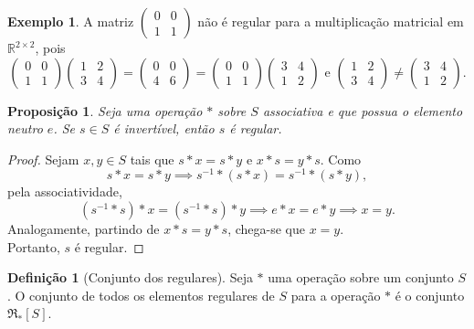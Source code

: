 \documentclass[a4paper,12pt]{article}
\theoremstyle{plain}
\newtheorem{proposicao}{Proposição}[section]
\theoremstyle{definition}
\newtheorem{definicao}{Definição}[section]
\newtheorem{exemplo}{Exemplo}[section]
\begin{document}
\begin{exemplo}
	A matriz $\begin{pmatrix}
		0&0\\1&1
	\end{pmatrix}$ não é regular para a multiplicação matricial em $\mathbb{R}^{2\times 2}$, pois
	$$
	\begin{pmatrix}
		0&0\\1&1
	\end{pmatrix}
	\begin{pmatrix}
		1&2\\3&4
	\end{pmatrix}
	= \begin{pmatrix}
		0&0\\4&6
	\end{pmatrix}
	= \begin{pmatrix}
		0&0\\1&1
	\end{pmatrix}
	\begin{pmatrix}
		3&4\\1&2
	\end{pmatrix} \text{ e }
	\begin{pmatrix}
		1&2\\3&4
	\end{pmatrix}
	\neq \begin{pmatrix}
		3&4\\1&2
	\end{pmatrix}.
	$$
\end{exemplo}

\begin{proposicao}
	Seja uma operação $*$ sobre $S$ associativa e que possua o elemento neutro $e$. Se $s\in S$ é invertível, então $s$ é regular.
\end{proposicao}
\begin{proof}
	Sejam $x,y\in S$ tais que $s*x = s*y$ e $x*s = y*s$. 
	Como $$s*x = s*y \implies s^{-1}*(s*x) = s^{-1}*(s*y),$$ pela associatividade, $$(s^{-1}*s)*x = (s^{-1}*s)*y \implies e*x = e*y \implies x = y.$$ 
	Analogamente, partindo de $x*s = y*s$, chega-se que $x = y$. \\Portanto, $s$ é regular.
\end{proof}

\begin{definicao}[Conjunto dos regulares]
	Seja $*$ uma operação sobre um conjunto $S$. O conjunto de todos os elementos regulares de $S$ para a operação $*$ é o conjunto $\mathfrak{R}_*[S]$.
\end{definicao}
\end{document}
